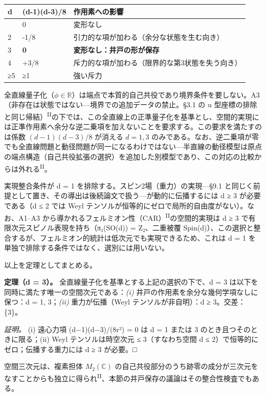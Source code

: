\documentclass[fontsize=11pt,paper=a4,lualatex]{jlreq}
\newcommand{\PII}{\textsuperscript{\textup{II}}}
\begin{document}
\begin{longtable}[]{@{}lll@{}}
\toprule\noalign{}
d & (d-1)(d-3)/8 & 作用素への影響 \\
\midrule\noalign{}
\endhead
\bottomrule\noalign{}
\endlastfoot
1 & 0 & 変形なし \\
2 & -1/8 & 引力的な項が加わる（余分な状態を生む向き） \\
3 & \textbf{0} & \textbf{変形なし：井戸の形が保存} \\
4 & +3/8 & 斥力的な項が加わる（限界的な第3状態を失う向き） \\
≥5 & ≥1 & 強い斥力 \\
\end{longtable}

全直線量子化（$\phi \in \mathbb{R}$）は端点で本質的自己共役であり境界条件を要しない。A3（非存在は状態ではない---境界での追加データの禁止。§3.1 の u 型座標の排除と同じ帰結）\PII{}の下では、この全直線上の正準量子化を基準とし、空間的実現には正準作用素へ余分な逆二乗項を加えないことを要求する。この要求を満たすのは係数 $(d-1)(d-3)/8$ が消える $d = 1, 3$ のみである。なお、逆二乗項が零でも全直線問題と動径問題が同一になるわけではない---半直線の動径模型は原点の端点構造（自己共役拡張の選択）を追加した別模型であり、この対応の比較からは外れる\PII{}。

実現整合条件が d = 1 を排除する。スピン2場（重力）の実現---§9.1 と同じく前提として置き、その導出は後続論文で扱う---が動的に伝播するには d ≥ 3 が必要である（d ≤ 2 では Weyl テンソルが恒等的にゼロで局所的自由度がない）。なお、A1--A3 から導かれるフェルミオン性（CAR）\PII{}の空間的実現は d ≥ 3 で有限次元スピノル表現を持ち（π₁(SO(d)) = Z₂、二重被覆 Spin(d)）、この選択と整合するが、フェルミオン的統計は低次元でも実現できるため、これは d = 1 を単独で排除する条件ではなく、選別には用いない。

以上を定理としてまとめる。

\textbf{定理（d = 3）。} 全直線量子化を基準とする上記の選択の下で、d = 3 は以下を同時に満たす唯一の空間次元である：\emph{(i)} 井戸の作用素を余分な幾何学項なしに保つ：d = 1, 3；\emph{(ii)}
重力が伝播（Weyl テンソルが非自明）：d ≥ 3。交差：\{3\}。

\emph{証明。} (i) 遠心力項 (d−1)(d−3)/(8r²) = 0 は d = 1 または 3 のとき且つそのときに限る；(ii) Weyl テンソルは時空次元 ≤ 3（すなわち空間 d ≤ 2）で恒等的にゼロ；伝播する重力には d ≥ 3 が必要。□

空間三次元は、複素担体 $M_2(\mathbb{C})$ の自己共役部分のうち跡零の成分が三次元をなすことからも独立に得られ\PII{}、本節の井戸保存の議論はその整合性検査でもある。
\end{document}
